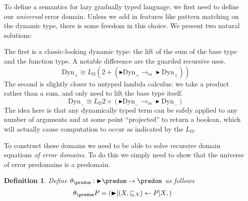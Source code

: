 \documentclass{article}
\newtheorem{definition}{Definition}[section]
\newcommand{\dyn}{\text{Dyn}}
\newcommand{\later}{{\blacktriangleright}}
\newcommand{\err}{\mho}
\newcommand{\errlift}{L_\err}
\newcommand{\ltdynp}[1]{\mathrel{\sqsubseteq_{#1}}}
\newcommand{\monto}{\mathrel{\to_{m}}}
\begin{document}
To define a semantics for lazy gradually typed language, we first need
to define our \emph{universal} error domain. Unless we add in features
like pattern matching on the dynamic type, there is some freedom in
this choice. We present two natural solutions:

The first is a classic-looking dynamic type: the lift of the sum of
the base type and the function type. A notable difference are the
guarded recursive uses.
\[ \dyn_+ \cong \errlift (2 + (\later \dyn_+ \monto \later \dyn_+)) \]
The second is slightly closer to untyped lambda calculus: we take a
product rather than a sum, and only need to lift the base type itself.
\[ \dyn_- \cong \errlift 2 \times (\later \dyn_- \monto \later \dyn_-) \]
The idea here is that any dynamically typed term can be safely applied
to any number of arguments and at some point ``projected'' to return a
boolean, which will actually cause computation to occur as indicated
by the $\errlift$.

To construct these domains we need to be able to solve recursive
domain equations \emph{of error domains}. To do this we simply need to
show that the universe of error predomains is a predomain.

\begin{definition}
  Define $\theta_{\predom} : \later \predom \to \predom$ as follows
  \begin{align*}
    \theta_{\predom}P &= (\later[(X,\ltdynp X) \leftarrow P] X, )
  \end{align*}
\end{definition}
\end{document}
